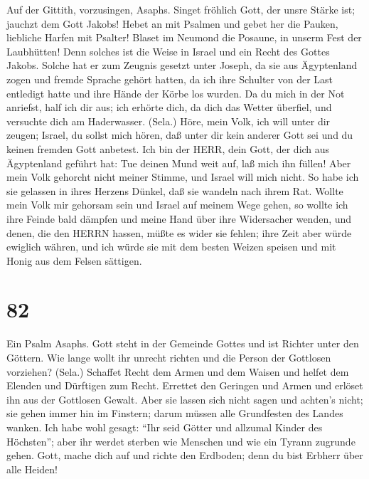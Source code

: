  Auf der Gittith, vorzusingen, Asaphs. Singet fröhlich Gott,
der unsre Stärke ist; jauchzt dem Gott Jakobs!  Hebet an mit
Psalmen und gebet her die Pauken, liebliche Harfen mit Psalter!
 Blaset im Neumond die Posaune, in unserm Fest der
Laubhütten!  Denn solches ist die Weise in Israel und ein
Recht des Gottes Jakobs.  Solche hat er zum Zeugnis gesetzt
unter Joseph, da sie aus Ägyptenland zogen und fremde Sprache gehört
hatten,  da ich ihre Schulter von der Last entledigt hatte
und ihre Hände der Körbe los wurden.  Da du mich in der Not
anriefst, half ich dir aus; ich erhörte dich, da dich das Wetter
überfiel, und versuchte dich am Haderwasser. (Sela.)  Höre,
mein Volk, ich will unter dir zeugen; Israel, du sollst mich hören,
 daß unter dir kein anderer Gott sei und du keinen fremden
Gott anbetest.  Ich bin der HERR, dein Gott, der dich aus
Ägyptenland geführt hat: Tue deinen Mund weit auf, laß mich ihn füllen!
 Aber mein Volk gehorcht nicht meiner Stimme, und Israel
will mich nicht.  So habe ich sie gelassen in ihres Herzens
Dünkel, daß sie wandeln nach ihrem Rat.  Wollte mein Volk
mir gehorsam sein und Israel auf meinem Wege gehen,  so
wollte ich ihre Feinde bald dämpfen und meine Hand über ihre Widersacher
wenden,  und denen, die den HERRN hassen, müßte es wider
sie fehlen; ihre Zeit aber würde ewiglich währen,  und ich
würde sie mit dem besten Weizen speisen und mit Honig aus dem Felsen
sättigen.

\hypertarget{section-81}{%
\section{82}\label{section-81}}

 Ein Psalm Asaphs. Gott steht in der Gemeinde Gottes und ist
Richter unter den Göttern.  Wie lange wollt ihr unrecht
richten und die Person der Gottlosen vorziehen? (Sela.) 
Schaffet Recht dem Armen und dem Waisen und helfet dem Elenden und
Dürftigen zum Recht.  Errettet den Geringen und Armen und
erlöset ihn aus der Gottlosen Gewalt.  Aber sie lassen sich
nicht sagen und achten's nicht; sie gehen immer hin im Finstern; darum
müssen alle Grundfesten des Landes wanken.  Ich habe wohl
gesagt: ``Ihr seid Götter und allzumal Kinder des Höchsten'';
 aber ihr werdet sterben wie Menschen und wie ein Tyrann
zugrunde gehen.  Gott, mache dich auf und richte den
Erdboden; denn du bist Erbherr über alle Heiden!

